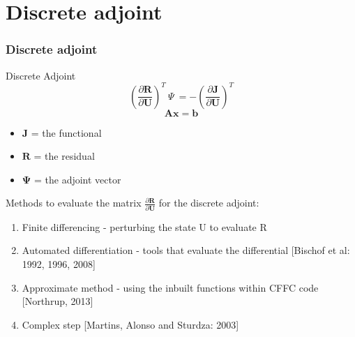\documentclass{beamer}
\begin{document}

\section{Discrete adjoint}
\begin{frame}
\frametitle{Discrete adjoint}
\scriptsize
\begin{minipage}[t][1\textheight]{1\textwidth}
\vspace{-15pt}
\begin{exampleblock}{Discrete Adjoint}
\vspace{-8pt}
\[\left( \frac{\partial{\mathbf{R}}}{\partial{\mathbf{U}}} \right)^T ~\Psi~ = -\left( \frac{\partial{\mathbf{J}}}{\partial{\mathbf{U}}} \right)^T\]
\vspace{-10pt}
\[\mathbf{Ax} = \mathbf{b}\] %
\begin{itemize}
\tiny
\item \textbf{$\mathbf{J}$} = the functional
\item \textbf{$\mathbf{R}$} =  the residual
\item \textbf{$\mathbf{\Psi}$} = the adjoint vector
\end{itemize}
\end{exampleblock}

\vspace{0pt}
Methods to evaluate the matrix $\frac{\partial{\mathbf{R}}}{\partial{\mathbf{U}}} $  for the discrete adjoint:
\vspace{2pt}
\begin{enumerate}[1.]
\tiny
\item Finite differencing - perturbing the state U to evaluate R 
\item Automated differentiation - tools that evaluate the differential [Bischof et al: 1992, 1996, 2008]
\item Approximate method  - using the inbuilt functions within CFFC code [Northrup, 2013]
\item Complex step [Martins, Alonso and Sturdza: 2003]
\end{enumerate}
\end{minipage}


\end{frame}


\end{document}
